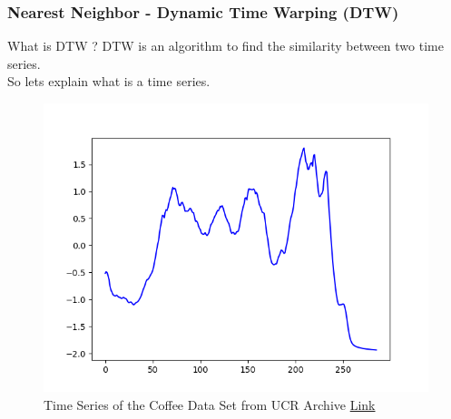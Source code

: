 \documentclass{beamer}
\begin{document}
\begin{frame}
\frametitle{Nearest Neighbor - Dynamic Time Warping (DTW)}
\begin{block}{What is DTW ?}
DTW is an algorithm to find the similarity between two time series.\\
So lets explain what is a time series.
\end{block}
\begin{figure}
\centering
\includegraphics[scale=0.4]{Coffee.png}
\caption{Time Series of the Coffee Data Set from UCR Archive \textcolor{blue}{\href{https://www.cs.ucr.edu/~eamonn/time_series_data_2018/}{Link}}}
\end{figure}

\end{frame}
\end{document}
